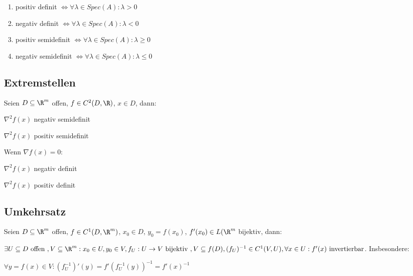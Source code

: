 \begin{enumerate}[label=(\alph*)]
	\item positiv definit $\Leftrightarrow \forall \lambda \in Spec(A) : \lambda > 0$
	\item negativ definit $\Leftrightarrow \forall \lambda \in Spec(A) : \lambda < 0$
	\item positiv semidefinit $\Leftrightarrow \forall \lambda \in Spec(A) : \lambda \geq 0$
	\item negativ semidefinit $\Leftrightarrow \forall \lambda \in Spec(A) : \lambda \leq 0$
\end{enumerate}

\subsection*{Extremstellen}

Seien $D \subseteq \R^m$ offen, $f \in C^2(D, \R)$, $x \in D$, dann:

\begin{description}[leftmargin=!,labelwidth=28mm]
	\item[Maximum] $\nabla^2 f(x)$ negativ semidefinit
	\item[Minimum] $\nabla^2 f(x)$ positiv semidefinit
\end{description}

Wenn $\nabla f(x) = 0$:

\begin{description}[leftmargin=!,labelwidth=28mm]
	\item[Maximum (strikt)] $\nabla^2 f(x)$ negativ definit
	\item[Minimum (strikt)] $\nabla^2 f(x)$ positiv definit
\end{description}

\subsection*{Umkehrsatz}

Seien $D \subseteq \R^m$ offen, $f \in C^1(D, \R^m)$, $x_0 \in D$, $y_0 = f(x_0)$, $f'(x_0) \in L(\R^m$ bijektiv, dann:

$\exists U \subseteq D \text{ offen }, V \subseteq \R^m : x_0 \in U, y_0 \in V, f_U : U \rightarrow V \text{ bijektiv }, V \subseteq f(D), (f_U)^{-1} \in C^1(V, U), \forall x \in U : f'(x) \text{ invertierbar}$. Insbesondere:

$\forall y=f(x) \in V : (f_U^{-1})'(y) = f'(f_U^{-1}(y))^{-1} = f'(x)^{-1}$


